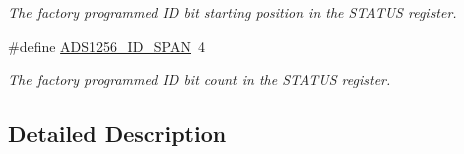 \begin{DoxyCompactItemize}
\begin{DoxyCompactList}\small\item\em The factory programmed I\-D bit starting position in the S\-T\-A\-T\-U\-S register. \end{DoxyCompactList}\item 
\hypertarget{group__status__register_ga4b89c536e185cfdbd9fa248a3e3772b7}{\#define \hyperlink{group__status__register_ga4b89c536e185cfdbd9fa248a3e3772b7}{A\-D\-S1256\-\_\-\-I\-D\-\_\-\-S\-P\-A\-N}~4}\label{group__status__register_ga4b89c536e185cfdbd9fa248a3e3772b7}

\begin{DoxyCompactList}\small\item\em The factory programmed I\-D bit count in the S\-T\-A\-T\-U\-S register. \end{DoxyCompactList}\end{DoxyCompactItemize}


\subsection{Detailed Description}
